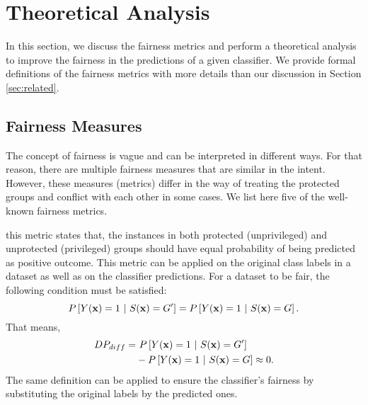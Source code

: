 
\section{Theoretical Analysis}
\label{sec:theory}

In this section, we discuss the fairness metrics and perform a theoretical analysis to improve the fairness in the predictions of a given classifier. We provide formal definitions of the fairness metrics with more details than our discussion in Section \ref{sec:related}. 

\subsection{Fairness Measures}

The concept of fairness is vague and can be interpreted in different ways. For that reason, there are multiple fairness measures that are similar in the intent. However, these measures (metrics) differ in the way of treating the protected groups and conflict with each other in some cases. We list here five of the well-known fairness metrics. 


 this metric states that, the instances in both protected (unprivileged) and unprotected (privileged) groups should have equal probability of being predicted as positive outcome. This metric can be applied on the original class labels in a dataset as well as on the classifier predictions. For a dataset to be fair, the following condition must be satisfied:
\[P\left[Y({\bf x})=1\ |\ S({\bf x})=G' \right]  = P\left[Y({\bf x})=1\ |\ S({\bf x}) = G \right].\] That means, 
\begin{align} \label{eq:DPDiff}
\begin{split}
DP_{diff} = &\ P\left[Y({\bf x})=1\ |\ S({\bf x})=G' \right]
    \\& - P\left[ {Y({\bf x})}=1\ |\ S({\bf x}) = G \right] \approx 0.
\end{split}
\end{align}
The same definition can be applied to ensure the classifier's fairness by substituting the original labels by the predicted ones.%

